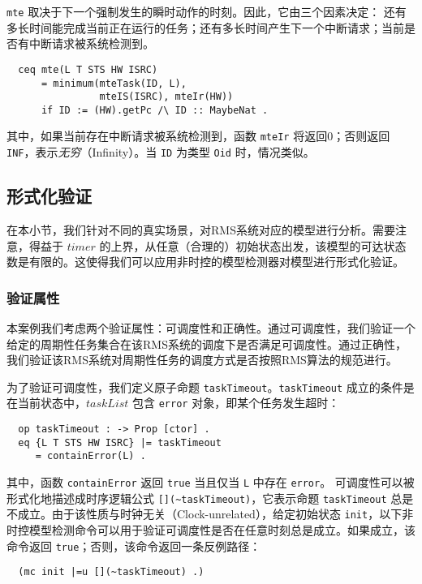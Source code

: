 \verb|mte| 取决于下一个强制发生的瞬时动作的时刻。因此，它由三个因素决定：
还有多长时间能完成当前正在运行的任务；还有多长时间产生下一个中断请求；当前是否有中断请求被系统检测到。
\begin{verbatim}
  ceq mte(L T STS HW ISRC)
      = minimum(mteTask(ID, L),
                mteIS(ISRC), mteIr(HW))
      if ID := (HW).getPc /\ ID :: MaybeNat .
\end{verbatim}
其中，如果当前存在中断请求被系统检测到，函数 \verb|mteIr| 将返回0；否则返回 \verb|INF|，表示\emph{无穷}（Infinity）。当 \verb|ID| 为类型 \verb|Oid| 时，情况类似。


\subsection{形式化验证}
\label{s:verification}
在本小节，我们针对不同的真实场景，对RMS系统对应的模型进行分析。需要注意，得益于 $\mathit{timer}$ 的上界，从任意（合理的）初始状态出发，该模型的可达状态数是有限的。这使得我们可以应用非时控的模型检测器对模型进行形式化验证。

\subsubsection{验证属性}
本案例我们考虑两个验证属性：可调度性和正确性。通过可调度性，我们验证一个给定的周期性任务集合在该RMS系统的调度下是否满足可调度性。通过正确性，我们验证该RMS系统对周期性任务的调度方式是否按照RMS算法的规范进行。

为了验证可调度性，我们定义原子命题 \verb|taskTimeout|。\verb|taskTimeout| 成立的条件是在当前状态中，$\mathit{taskList}$ 包含 \verb|error| 对象，即某个任务发生超时：
\begin{verbatim}
  op taskTimeout : -> Prop [ctor] .
  eq {L T STS HW ISRC} |= taskTimeout 
     = containError(L) .
\end{verbatim}
其中，函数 \verb|containError| 返回 \verb|true| 当且仅当 \verb|L| 中存在
\verb|error|。 可调度性可以被形式化地描述成时序逻辑公式
\verb|[](~taskTimeout)|，它表示命题 \verb|taskTimeout| 总是不成立。由于该性质与时钟无关（Clock-unrelated），给定初始状态 \verb|init|，以下非时控模型检测命令可以用于验证可调度性是否在任意时刻总是成立。如果成立，该命令返回 \verb|true|；否则，该命令返回一条反例路径：
\begin{verbatim}
  (mc init |=u [](~taskTimeout) .)
\end{verbatim}

